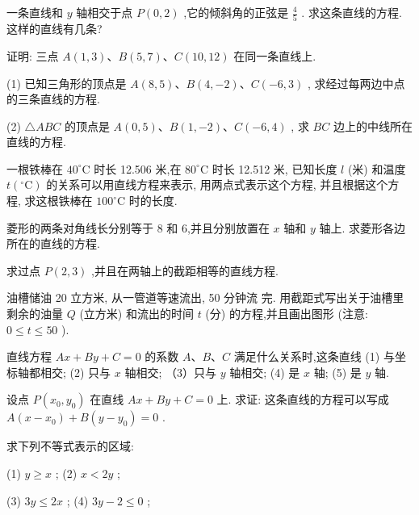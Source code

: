\documentclass[lang=cn,newtx,10pt,scheme=chinese]{elegantbook}
\begin{document}
\begin{problemset}[习 题 二]
\item 一条直线和 \(y\) 轴相交于点 \(P\left( {0,2}\right)\) ,它的倾斜角的正弦是 \(\frac{4}{5}\) . 求这条直线的方程. 这样的直线有几条?

\item 证明: 三点 \(A\left( {1,3}\right) \text{、}B\left( {5,7}\right) \text{、}C\left( {{10},{12}}\right)\) 在同一条直线上.

\item (1) 已知三角形的顶点是 \(A\left( {8,5}\right) \text{、}B\left( {4, - 2}\right) \text{、}C\left( {-6,3}\right)\) , 求经过每两边中点的三条直线的方程.

(2) \(\bigtriangleup {ABC}\) 的顶点是 \(A\left( {0,5}\right) \text{、}B\left( {1, - 2}\right) \text{、}C\left( {-6,4}\right)\) , 求 \({BC}\) 边上的中线所在直线的方程.

\item 一根铁棒在 \({40}^{ \circ }\mathrm{C}\) 时长 12.506 米,在 \({80}^{ \circ }\mathrm{C}\) 时长 12.512 米, 已知长度 \(l\) (米) 和温度 \(t\left( {{}^{ \circ }\mathrm{C}}\right)\) 的关系可以用直线方程来表示, 用两点式表示这个方程, 并且根据这个方程, 求这根铁棒在 \({100}^{ \circ }\mathrm{C}\) 时的长度.

\item 菱形的两条对角线长分别等于 8 和 6,并且分别放置在 \(x\) 轴和 \(y\) 轴上. 求菱形各边所在的直线的方程.

\item 求过点 \(P\left( {2,3}\right)\) ,并且在两轴上的截距相等的直线方程.

\item 油槽储油 20 立方米, 从一管道等速流出, 50 分钟流 完. 用截距式写出关于油槽里剩余的油量 \(Q\) (立方米) 和流出的时间 \(t\) (分) 的方程,并且画出图形 (注意: \(0 \leq t \leq {50}\) ).

\item 直线方程 \({Ax} + {By} + C = 0\) 的系数 \(A\text{、}B\text{、}C\) 满足什么关系时,这条直线 (1) 与坐标轴都相交; (2) 只与 \(x\) 轴相交; （3）只与 \(y\) 轴相交; (4) 是 \(x\) 轴; (5) 是 \(y\) 轴.

\item 设点 \(P\left( {{x}_{0},{y}_{0}}\right)\) 在直线 \({Ax} + {By} + C = 0\) 上. 求证: 这条直线的方程可以写成 \(A\left( {x - {x}_{0}}\right) + B\left( {y - {y}_{0}}\right) = 0\) .

\item * 求下列不等式表示的区域:

(1) \(y \geq x\) ; (2) \(x < {2y}\) ;

(3) \({3y} \leq {2x}\) ; (4) \({3y} - 2 \leq 0\) ;


\end{problemset}
\end{document}
